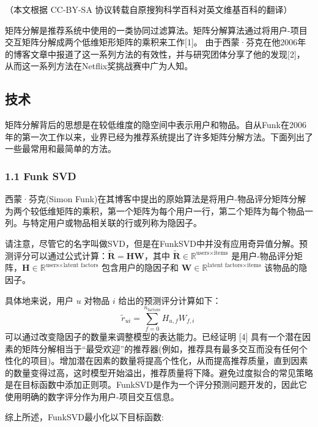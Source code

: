 
（本文根据 CC-BY-SA 协议转载自原搜狗科学百科对英文维基百科的翻译）

矩阵分解是推荐系统中使用的一类协同过滤算法。矩阵分解算法通过将用户-项目交互矩阵分解成两个低维矩形矩阵的乘积来工作[1]。 由于西蒙·芬克在他2006年的博客文章中报道了这一系列方法的有效性，并与研究团体分享了他的发现[2]，从而这一系列方法在Netflix奖挑战赛中广为人知。

\subsection{技术}
矩阵分解背后的思想是在较低维度的隐空间中表示用户和物品。自从Funk在2006年的第一次工作以来，业界已经为推荐系统提出了许多矩阵分解方法。下面列出了一些最常用和最简单的方法。
\subsubsection{1.1 Funk SVD}
西蒙·芬克(Simon Funk)在其博客中提出的原始算法是将用户-物品评分矩阵分解为两个较低维矩阵的乘积，第一个矩阵为每个用户一行，第二个矩阵为每个物品一列。与特定用户或物品相关联的行或列称为隐因子。

请注意，尽管它的名字叫做SVD，但是在FunkSVD中并没有应用奇异值分解。预测评分可以通过公式计算：$\tilde{\mathbf{R}} = \mathbf{H} \mathbf{W}$，其中 $\tilde{\mathbf{R}} \in \mathbb{R}^{\text{users} \times \text{items}}$ 是用户-物品评分矩阵，$\mathbf{H} \in \mathbb{R}^{\text{users} \times \text{latent factors}}$ 包含用户的隐因子和 $\mathbf{W} \in \mathbb{R}^{\text{latent factors} \times \text{items}}$ 该物品的隐因子。

具体地来说，用户 $u$ 对物品 $i$ 给出的预测评分计算如下：
$$\tilde{r}_{ui} = \sum_{f=0}^{n_{\text{factors}}} H_{u,f} W_{f,i}~$$
可以通过改变隐因子的数量来调整模型的表达能力。已经证明 [4] 具有一个潜在因素的矩阵分解相当于“最受欢迎”的推荐器(例如，推荐具有最多交互而没有任何个性化的项目)。增加潜在因素的数量将提高个性化，从而提高推荐质量，直到因素的数量变得过高，这时模型开始溢出，推荐质量将下降。避免过度拟合的常见策略是在目标函数中添加正则项。FunkSVD是作为一个评分预测问题开发的，因此它使用明确的数字评分作为用户-项目交互信息。

综上所述，FunkSVD最小化以下目标函数: